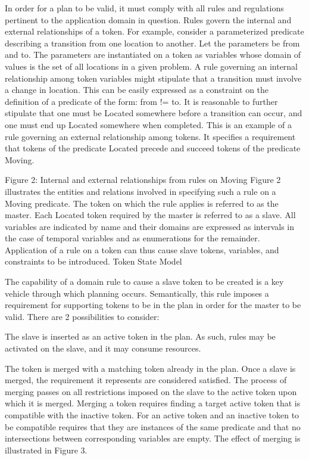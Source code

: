 In order for a plan to be valid, it must comply with all rules and
regulations pertinent to the application domain in question. Rules
govern the internal and external relationships of a token. For
example, consider a parameterized predicate describing a transition
from one location to another. Let the parameters be from and to. The
parameters are instantiated on a token as variables whose domain of
values is the set of all locations in a given problem. A rule
governing an internal relationship among token variables might
stipulate that a transition must involve a change in location. This
can be easily expressed as a constraint on the definition of a
predicate of the form: from != to. It is reasonable to further
stipulate that one must be Located somewhere before a transition can
occur, and one must end up Located somewhere when completed. This is
an example of a rule governing an external relationship among
tokens. It specifies a requirement that tokens of the predicate
Located precede and succeed tokens of the predicate Moving.

Figure 2: Internal and external relationships from rules on Moving
Figure 2 illustrates the entities and relations involved in specifying
such a rule on a Moving predicate. The token on which the rule applies
is referred to as the master. Each Located token required by the
master is referred to as a slave. All variables are indicated by name
and their domains are expressed as intervals in the case of temporal
variables and as enumerations for the remainder. Application of a rule
on a token can thus cause slave tokens, variables, and constraints to
be introduced.  Token State Model

The capability of a domain rule to cause a slave token to be created
is a key vehicle through which planning occurs. Semantically, this
rule imposes a requirement for supporting tokens to be in the plan in
order for the master to be valid. There are 2 possibilities to
consider:

The slave is inserted as an active token in the plan. As such, rules
may be activated on the slave, and it may consume resources.

The token is merged with a matching token already in the plan. Once a
slave is merged, the requirement it represents are considered
satisfied. The process of merging passes on all restrictions imposed
on the slave to the active token upon which it is merged. Merging a
token requires finding a target active token that is compatible with
the inactive token. For an active token and an inactive token to be
compatible requires that they are instances of the same predicate and
that no intersections between corresponding variables are empty. The
effect of merging is illustrated in Figure 3.

